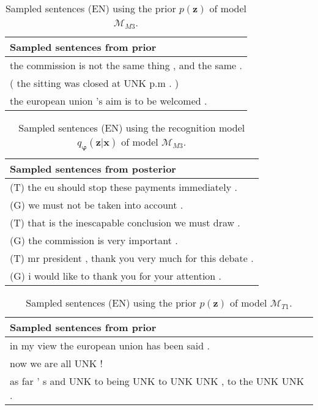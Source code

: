 \begin{table}
  \centering
  \begin{tabular}{|L{14cm}|} 
    \hline
    Sampled sentences from prior\\ [0.5ex] 
    \hline\hline
    the commission is not the same thing , and the same .\\
    \hline
    ( the sitting was closed at UNK p.m . )\\
    \hline
    the european union 's aim is to be welcomed .\\
    \hline
  \end{tabular}
  \caption{Sampled sentences (EN) using the prior $p(\bm{z})$ of model $\mathcal{M}_{M3}$.}
\end{table}

\begin{table}
  \centering
  \begin{tabular}{|L{14cm}|} 
    \hline
    Sampled sentences from posterior\\ [0.5ex] 
    \hline\hline
    (T) the eu should stop these payments immediately .\\
    (G) we must not be taken into account .\\
    \hline
    (T) that is the inescapable conclusion we must draw .\\
    (G) the commission is very important .\\
    \hline
    (T) mr president , thank you very much for this debate .\\
    (G) i would like to thank you for your attention .\\
    \hline
  \end{tabular}
  \caption{Sampled sentences (EN) using the recognition model
    $q_{\bm{\varphi}}(\bm{z} | \bm{x})$ of model $\mathcal{M}_{M3}$.}
\end{table}

\begin{table}
  \centering
  \begin{tabular}{|L{14cm}|} 
    \hline
    Sampled sentences from prior\\ [0.5ex] 
    \hline\hline
    in my view the european union has been said .\\
    \hline
    now we are all UNK ! \\
    \hline
    as far ' s and UNK to being UNK to UNK UNK , to the UNK UNK .\\
    \hline
  \end{tabular}
  \caption{Sampled sentences (EN) using the prior $p(\bm{z})$ of model $\mathcal{M}_{T1}$.}
\end{table}

